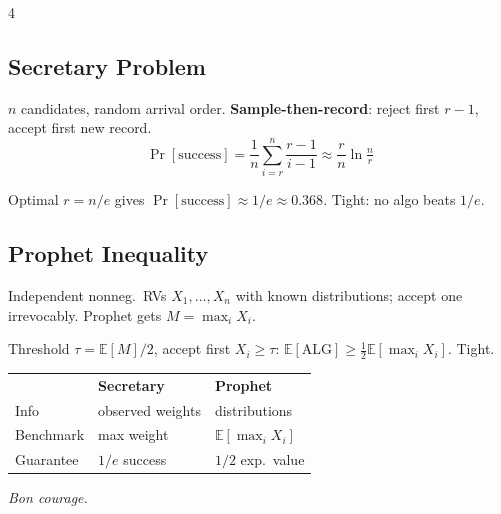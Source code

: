 \documentclass[8pt,a4paper,landscape]{extarticle}
\begin{document}
\begin{multicols*}{4}
\subsection{Secretary Problem}
$n$ candidates, random arrival order. \textbf{Sample-then-record}: reject first $r{-}1$, accept first new record.
\[ \Pr[\text{success}] = \frac{1}{n}\sum_{i=r}^{n}\frac{r-1}{i-1} \approx \frac{r}{n}\ln\!\tfrac{n}{r} \]
\begin{thm}
Optimal $r=n/e$ gives $\Pr[\text{success}]\approx 1/e\approx 0.368$. Tight: no algo beats $1/e$.
\end{thm}

\subsection{Prophet Inequality}
Independent nonneg.\ RVs $X_1,\ldots,X_n$ with known distributions; accept one irrevocably. Prophet gets $M=\max_i X_i$.
\begin{thm}
Threshold $\tau=\mathbb{E}[M]/2$, accept first $X_i\geq\tau$:
$\mathbb{E}[\text{ALG}]\geq\tfrac{1}{2}\mathbb{E}[\max_i X_i]$. Tight.
\end{thm}

\begin{defn}[title=Secretary vs Prophet]
\begin{tabular}{@{}lll@{}}
 & \textbf{Secretary} & \textbf{Prophet} \\
Info & observed weights & distributions \\
Benchmark & max weight & $\mathbb{E}[\max_i X_i]$ \\
Guarantee & $1/e$ success & $1/2$ exp.\ value \\
\end{tabular}
\end{defn}

\vfill
\begin{center}
\textit{Bon courage.}
\end{center}

\end{multicols*}
\end{document}
